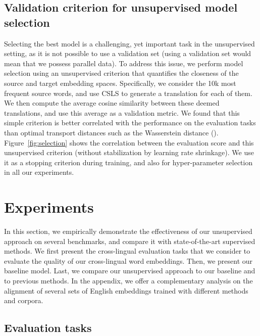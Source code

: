 \documentclass{article} \usepackage{iclr2018_conference,times}
\newcommand{\hub}{CSLS\xspace}
\begin{document}
\subsection{Validation criterion for unsupervised model selection}
\label{sec:selection}
Selecting the best model is a challenging, yet important task in the unsupervised setting, as it is not possible to use a validation set (using a validation set would mean that we possess parallel data). To address this issue, we perform model selection using an unsupervised criterion that quantifies the closeness of the source and target embedding spaces. Specifically, we consider the 10k most frequent source words, and use \hub to generate a translation for each of them. We then compute the average cosine similarity between these deemed translations, and use this average as a validation metric. We found that this simple criterion is better correlated with the performance on the evaluation tasks than optimal transport distances such as the Wasserstein distance (\cite{rubner2000earth}). Figure~\ref{fig:selection} shows the correlation between the evaluation score and this unsupervised criterion (without stabilization by learning rate shrinkage). We use it as a stopping criterion during training, and also for hyper-parameter selection in all our experiments.
 \section{Experiments}
\label{sec_experiments}

In this section, we empirically demonstrate the effectiveness of our unsupervised approach on several benchmarks, and compare it with state-of-the-art supervised methods. We first present the cross-lingual evaluation tasks that we consider to evaluate the quality of our cross-lingual word embeddings. Then, we present our baseline model.
Last, we compare our unsupervised approach to our baseline and to previous methods. In the appendix, we offer a complementary analysis on the alignment of several sets of English embeddings trained with different methods and corpora.

\insertwordtranslationall

\subsection{Evaluation tasks}
\end{document}
